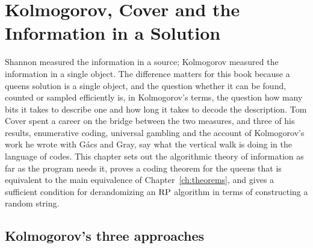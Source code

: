 \chapter{Kolmogorov, Cover and the Information in a Solution}
\label{ch:kolmogorov}

Shannon measured the information in a source; Kolmogorov measured the information in a single object. The difference matters for this book because a queens solution is a single object, and the question whether it can be found, counted or sampled efficiently is, in Kolmogorov's terms, the question how many bits it takes to describe one and how long it takes to decode the description. Tom Cover spent a career on the bridge between the two measures, and three of his results, enumerative coding, universal gambling and the account of Kolmogorov's work he wrote with G\'acs and Gray, say what the vertical walk is doing in the language of codes. This chapter sets out the algorithmic theory of information as far as the program needs it, proves a coding theorem for the queens that is equivalent to the main equivalence of Chapter~\ref{ch:theorems}, and gives a sufficient condition for derandomizing an $\mathrm{RP}$ algorithm in terms of constructing a random string.

\section{Kolmogorov's three approaches}

